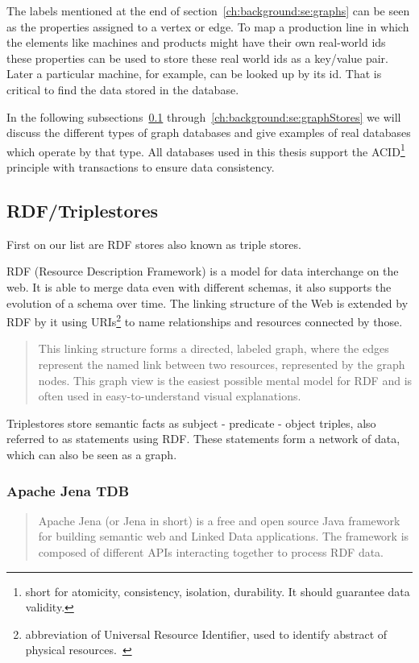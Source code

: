 The labels mentioned at the end of section~\ref{ch:background:se:graphs} can be seen as the properties assigned to a vertex or edge.
To map a production line in which the elements like machines and products might have their own real-world ids these properties can be used to store these real world ids as a key/value pair.
Later a particular machine,
for example,
can be looked up by its id.
That is critical to find the data stored in the database.

In the following subsections~\ref{ch:background:se:rdfTriplestores} through~\ref{ch:background:se:graphStores} we will discuss the different types of graph databases and give examples of real databases which operate by that type.
All databases used in this thesis support the ACID\footnote{short for atomicity, consistency, isolation, durability. It should guarantee data validity.} principle with transactions to ensure data consistency.

\subsection{RDF/Triplestores}
\label{ch:background:se:rdfTriplestores}
First on our list are RDF stores also known as triple stores.

RDF (Resource Description Framework) is a model for data interchange on the web.
It is able to merge data even with different schemas, it also supports the evolution of a schema over time.
The linking structure of the Web is extended by RDF by it using URIs\footnote{abbreviation of Universal Resource Identifier, used to identify abstract of physical resources.~\cite{Berners-Lee2005}} to name relationships and resources connected by those.~\cite[4]{Ontotext2014}

\blockquote[\cite{W3C2014}]{This linking structure forms a directed, labeled graph, where the edges represent the named link between two resources, represented by the graph nodes.
This graph view is the easiest possible mental model for RDF and is often used in easy-to-understand visual explanations.}

Triplestores store semantic facts as subject - predicate - object triples,
also referred to as statements using RDF.
These statements form a network of data,
which can also be seen as a graph.~\cite[4]{Ontotext2014}

\subsubsection{Apache Jena TDB}
\label{ch:background:se:apacheJena}
\blockquote[\cite{Apache2015}]{Apache Jena (or Jena in short) is a free and open source Java framework for building semantic web and Linked Data applications.
The framework is composed of different APIs interacting together to process RDF data.}

